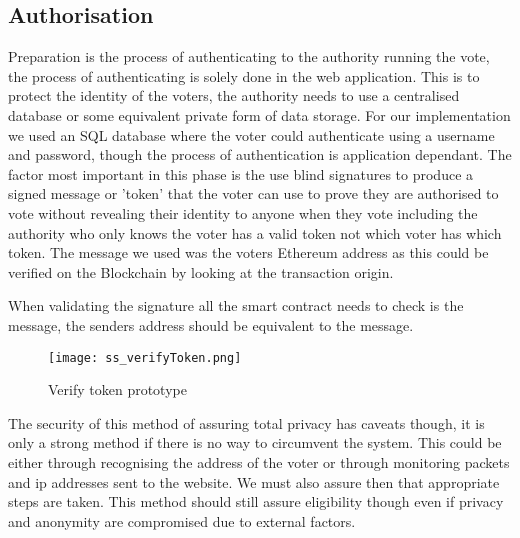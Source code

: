 \documentclass{entcs}
\begin{document}

\subsection{Authorisation}\label{sec: Auth}
Preparation is the process of authenticating to the authority running the vote, the process of authenticating is solely done in the web application. This is to protect the identity of the voters, the authority needs to use a centralised database or some equivalent private form of data storage. For our implementation we used an SQL database where the voter could authenticate using a username and password, though the process of authentication is application dependant. The factor most important in this phase is the use blind signatures to produce a signed message or 'token' that the voter can use to prove they are authorised to vote without revealing their identity to anyone when they vote including the authority who only knows the voter has a valid token not which voter has which token. The message we used was the voters Ethereum address as this could be verified on the Blockchain by looking at the transaction origin.

When validating the signature all the smart contract needs to check is the message, the senders address should be equivalent to the message.
\begin{figure}[h!]
    \centering
    \texttt{[image: ss\_verifyToken.png]}
    \caption{Verify token prototype}
    \label{fig:verifyToken}
\end{figure}
The security of this method of assuring total privacy has caveats though, it is only a strong method if there is no way to circumvent the system. This could be either through recognising the address of the voter or through monitoring packets and ip addresses sent to the website. We must also assure then that appropriate steps are taken.
This method should still assure eligibility though even if privacy and anonymity are compromised due to external factors.
\end{document}

